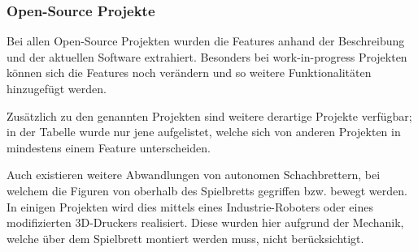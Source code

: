 \hypertarget{open-source-projekte}{%
\subsubsection{Open-Source Projekte}\label{open-source-projekte}}

Bei allen Open-Source Projekten wurden die Features anhand der
Beschreibung und der aktuellen Software extrahiert. Besonders bei
work-in-progress Projekten können sich die Features noch verändern und
so weitere Funktionalitäten hinzugefügt werden.

Zusätzlich zu den genannten Projekten sind weitere derartige Projekte
verfügbar; in der Tabelle wurde nur jene aufgelistet, welche sich von
anderen Projekten in mindestens einem Feature unterscheiden.

Auch existieren weitere Abwandlungen von autonomen Schachbrettern, bei
welchem die Figuren von oberhalb des Spielbretts gegriffen bzw. bewegt
werden. In einigen Projekten wird dies mittels eines Industrie-Roboters
\cite{actprojectrobot} oder eines modifizierten
3D-Druckers\cite{atcproject3dprinter} realisiert. Diese wurden hier
aufgrund der Mechanik, welche über dem Spielbrett montiert werden muss,
nicht berücksichtigt.


